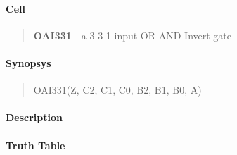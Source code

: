 \label{OAI331}
\paragraph{Cell}
\begin{quote}
    \textbf{OAI331} - a 3-3-1-input OR-AND-Invert gate
\end{quote}

\paragraph{Synopsys}
\begin{quote}
    OAI331(Z, C2, C1, C0, B2, B1, B0, A)
\end{quote}

\paragraph{Description}

%

\paragraph{Truth Table}


